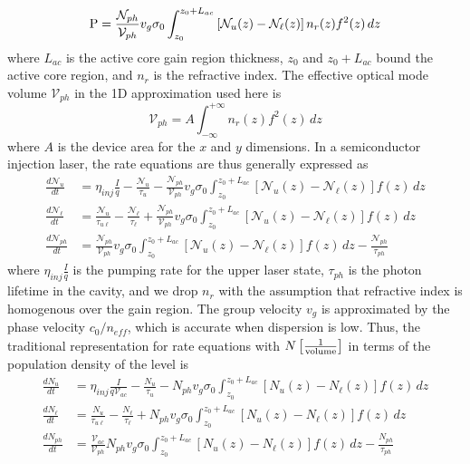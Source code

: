 \documentclass[12pt]{report}
\begin{document}
\begin{equation}
\textnormal{P} = \frac{\mathcal{N}_{ph}}{\mathcal{V}_{ph}} v_g \sigma_0 \int_{z_0}^{z_0+L_{ac}} \left[\mathcal{N}_u(z)-\mathcal{N}_\ell(z)\right] n_r(z) f^2(z) \,dz
\end{equation}
where $L_{ac}$ is the active core gain region thickness, $z_0$ and $z_0+L_{ac}$ bound the active core region, and $n_r$ is the refractive index. The effective optical mode volume $\mathcal{V}_{ph}$ in the 1D approximation used here is
\begin{equation}
\mathcal{V}_{ph} = A \int_{-\infty}^{+\infty} n_r(z) f^2(z) \,dz
\end{equation}
where $A$ is the device area for the $x$ and $y$ dimensions. In a semiconductor injection laser, the rate equations are thus generally expressed as
\begin{subequations}
\label{chpt1eqn:req1}
\begin{align}
\frac{d \mathcal{N}_u}{dt} &= \eta_\textit{inj}\frac{I}{q} - \frac{\mathcal{N}_u}{\tau_u} - \frac{\mathcal{N}_{ph}}{\mathcal{V}_{ph}} v_g \sigma_0 \int_{z_0}^{z_0+L_{ac}} \left[\mathcal{N}_u(z)-\mathcal{N}_\ell(z)\right] f(z) \,dz\\
\frac{d \mathcal{N}_\ell}{dt} &= \frac{\mathcal{N}_u}{\tau_{u\ell}} - \frac{\mathcal{N}_\ell}{\tau_\ell} + \frac{\mathcal{N}_{ph}}{\mathcal{V}_{ph}} v_g \sigma_0 \int_{z_0}^{z_0+L_{ac}} \left[\mathcal{N}_u(z)-\mathcal{N}_\ell(z)\right] f(z) \,dz\\
\frac{d \mathcal{N}_{ph}}{dt} &= \frac{\mathcal{N}_{ph}}{\mathcal{V}_{ph}} v_g \sigma_0 \int_{z_0}^{z_0+L_{ac}} \left[\mathcal{N}_u(z)-\mathcal{N}_\ell(z)\right] f(z) \,dz - \frac{\mathcal{N}_{ph}}{\tau_{ph}}
\end{align}
\end{subequations}
where $\eta_\textit{inj}\frac{I}{q}$ is the pumping rate for the upper laser state, $\tau_{ph}$ is the photon lifetime in the cavity, and we drop $n_r$ with the assumption that refractive index is homogenous over the gain region.  The group velocity $v_g$ is approximated by the phase velocity $c_0/n_\textit{eff}$, which is accurate when dispersion is low.
Thus, the traditional representation for rate equations with $N \left[\frac{1}{\textnormal{volume}}\right]$ in terms of the population density of the level is
\begin{subequations}
\begin{align}
\frac{d N_u}{dt}&=\eta_\textit{inj} \frac{I}{q \mathcal{V}_{ac}}-\frac{N_u}{\tau_u}- N_{ph} v_g \sigma_0 \int_{z_0}^{z_0+L_{ac}} \left[N_u(z)-N_\ell(z)\right] f(z) \,dz\\
%
\frac{d N_\ell}{dt}&=\frac{N_u}{\tau_{u\ell}}-\frac{N_\ell}{\tau_\ell}+N_{ph} v_g \sigma_0 \int_{z_0}^{z_0+L_{ac}} \left[N_u(z)-N_\ell(z)\right] f(z) \,dz\\
%
\frac{d N_{ph}}{dt}&=\frac{\mathcal{V}_{ac}}{\mathcal{V}_{ph}} N_{ph} v_g \sigma_0 \int_{z_0}^{z_0+L_{ac}} \left[N_u(z)-N_\ell(z)\right] f(z) \,dz - \frac{N_{ph}}{\tau_{ph}}
\label{chpt1eqn:req2c}
\end{align}
\end{subequations}
\end{document}
